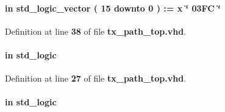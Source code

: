 \paragraph[{pct\+\_\+sync\+\_\+size}]{ {\bfseries \textcolor{keywordflow}{in}\textcolor{vhdlchar}{ }} {\bfseries \textcolor{comment}{std\+\_\+logic\+\_\+vector}\textcolor{vhdlchar}{ }\textcolor{vhdlchar}{(}\textcolor{vhdlchar}{ }\textcolor{vhdlchar}{ } \textcolor{vhdldigit}{15} \textcolor{vhdlchar}{ }\textcolor{keywordflow}{downto}\textcolor{vhdlchar}{ }\textcolor{vhdlchar}{ } \textcolor{vhdldigit}{0} \textcolor{vhdlchar}{ }\textcolor{vhdlchar}{)}\textcolor{vhdlchar}{ }\textcolor{vhdlchar}{ }\textcolor{vhdlchar}{ }\textcolor{vhdlchar}{\+:}\textcolor{vhdlchar}{=}\textcolor{vhdlchar}{ }\textcolor{vhdlchar}{ }\textcolor{vhdlchar}{x}\textcolor{vhdlchar}{ }\textcolor{keyword}{\char`\"{} 03\+F\+C \char`\"{}}\textcolor{vhdlchar}{ }} \hspace{0.3cm}{\ttfamily [Port]}}\label{classtx__path__top_a699186ecef7af0b40fd157cabcee7ec7}


Definition at line {\bf 38} of file {\bf tx\+\_\+path\+\_\+top.\+vhd}.

\paragraph[{pct\+\_\+wrclk}]{ {\bfseries \textcolor{keywordflow}{in}\textcolor{vhdlchar}{ }} {\bfseries \textcolor{comment}{std\+\_\+logic}\textcolor{vhdlchar}{ }} \hspace{0.3cm}{\ttfamily [Port]}}\label{classtx__path__top_a894c109983cb6e2a6fcd58ba7fec95d2}


Definition at line {\bf 27} of file {\bf tx\+\_\+path\+\_\+top.\+vhd}.

\paragraph[{reset\+\_\+n}]{ {\bfseries \textcolor{keywordflow}{in}\textcolor{vhdlchar}{ }} {\bfseries \textcolor{comment}{std\+\_\+logic}\textcolor{vhdlchar}{ }} \hspace{0.3cm}{\ttfamily [Port]}}\label{classtx__path__top_a446ea52ed8c4a84181a47d9165ce41a5}


